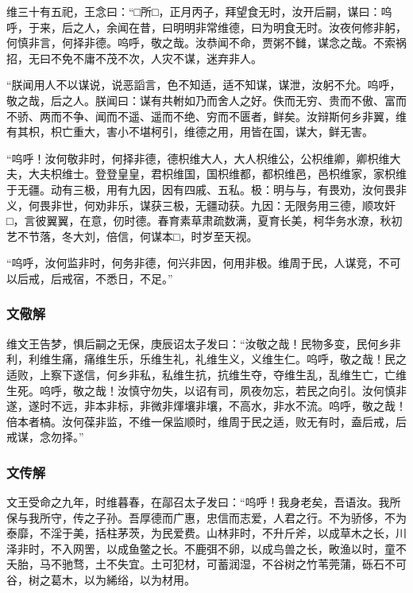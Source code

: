 \documentclass[]{article}
\begin{document}
维三十有五祀，王念曰：``□所□，正月丙子，拜望食无时，汝开后嗣，谋曰：呜呼，于来，后之人，余闻在昔，曰明明非常维德，曰为明食无时。汝夜何修非躬，何慎非言，何择非德。呜呼，敬之哉。汝恭闻不命，贾粥不雠，谋念之哉。不索祸招，无曰不免不庸不茂不次，人灾不谋，迷弃非人。

``朕闻用人不以谋说，说恶謟言，色不知适，适不知谋，谋泄，汝躬不允。呜呼，敬之哉，后之人。朕闻曰：谋有共軵如乃而舍人之好。佚而无穷、贵而不傲、富而不骄、两而不争、闻而不遥、遥而不绝、穷而不匮者，鲜矣。汝辩斯何乡非翼，维有其枳，枳亡重大，害小不堪柯引，维德之用，用皆在国，谋大，鲜无害。

``呜呼！汝何敬非时，何择非德，德枳维大人，大人枳维公，公枳维卿，卿枳维大夫，大夫枳维士。登登皇皇，君枳维国，国枳维都，都枳维邑，邑枳维家，家枳维于无疆。动有三极，用有九因，因有四戚、五私。极：明与与，有畏劝，汝何畏非义，何畏非世，何劝非乐，谋获三极，无疆动获。九因：无限务用三德，顺攻奸□，言彼翼翼，在意，仞时德。春育素草肃疏数满，夏育长美，柯华务水潦，秋初艺不节落，冬大刘，倍信，何谋本□，时岁至天视。

``呜呼，汝何监非时，何务非德，何兴非因，何用非极。维周于民，人谋竞，不可以后戒，后戒宿，不悉日，不足。''

\hypertarget{header-n143}{%
\subsubsection{文儆解}\label{header-n143}}

维文王告梦，惧后嗣之无保，庚辰诏太子发曰：``汝敬之哉！民物多变，民何乡非利，利维生痛，痛维生乐，乐维生礼，礼维生义，义维生仁。呜呼，敬之哉！民之适败，上察下遂信，何乡非私，私维生抗，抗维生夺，夺维生乱，乱维生亡，亡维生死。呜呼，敬之哉！汝慎守勿失，以诏有司，夙夜勿忘，若民之向引。汝何慎非遂，遂时不远，非本非标，非微非煇壤非壤，不高水，非水不流。呜呼，敬之哉！倍本者槁。汝何葆非监，不维一保监顺时，维周于民之适，败无有时，盍后戒，后戒谋，念勿择。''

\hypertarget{header-n147}{%
\subsubsection{文传解}\label{header-n147}}

文王受命之九年，时维暮春，在鄗召太子发曰：``呜呼！我身老矣，吾语汝。我所保与我所守，传之子孙。吾厚德而广惠，忠信而志爱，人君之行。不为骄侈，不为泰靡，不淫于美，括柱茅茨，为民爱费。山林非时，不升斤斧，以成草木之长，川泽非时，不入网罟，以成鱼鳖之长。不鹿弭不卵，以成鸟兽之长，畋渔以时，童不夭胎，马不驰骛，土不失宜。土可犯材，可蓄润湿，不谷树之竹苇莞蒲，砾石不可谷，树之葛木，以为絺绤，以为材用。
\end{document}

